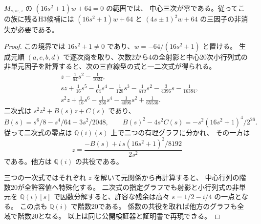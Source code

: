 \begin{proposition}\label{prop:cubic-CY-one-segre-square-split-open-Mzero}
$M_{s,w,z}$ の $(16s^2+1)w+64=0$ の範囲では、
中心三次が零である。従ってこの族に残るH3候補には
$(16s^2+1)w+64$ と $(4s\pm1)^2w+64$ の三因子の非消失が必要である。
\end{proposition}
\begin{proof}
この境界では $16s^2+1\ne0$ であり、$w=-64/(16s^2+1)$ と置ける。
生成元順 $(a,c,b,d)$ で逐次商を取り、次数2から4の全射影と中心20次小行列式の
非単元因子を計算すると、次の三直線型の式と一二次式が得られる。
\begin{align*}
 &z-\tfrac1{64}s^2-\tfrac1{1024},\\
 &sz+\tfrac1{16}s^5-\tfrac1{64}s^4-\tfrac1{128}s^3
      -\tfrac1{512}s^2-\tfrac3{4096}s-\tfrac1{16384},\\
 &s^2z+\tfrac1{16}s^6-\tfrac1{256}s^4-\tfrac1{4096}s^2+\tfrac1{65536}.
\end{align*}
二次式は $s^2z^2+B(s)z+C(s)$ であり、
\[
 B(s)=s^6/8-s^4/64-3s^2/2048,\qquad
 B(s)^2-4s^2C(s)=-s^2(16s^2+1)^4/2^{26}.
\]
従って二次式の零点は $\mathbb Q(i)(s)$ 上で二つの有理グラフに分かれ、
その一方は
\[
 z=\frac{-B(s)+i\,s(16s^2+1)^2/8192}{2s^2}
\]
である。他方は $\mathbb Q(i)$ の共役である。

三つの一次式ではそれぞれ $z$ を解いて元関係から再計算すると、
中心行列の階数20が全許容値へ特殊化する。
二次式の指定グラフでも射影と小行列式の非単元を
$\mathbb Q(i)[s]$ で因数分解すると、許容な残余は高々 $s=1/2-i/4$ の一点となる。
この点も $\mathbb Q(i)$ で階数20である。
係数の共役を取れば他方のグラフも全域で階数20となる。
以上は同じ公開検証器と証明書で再現できる。
\end{proof}

